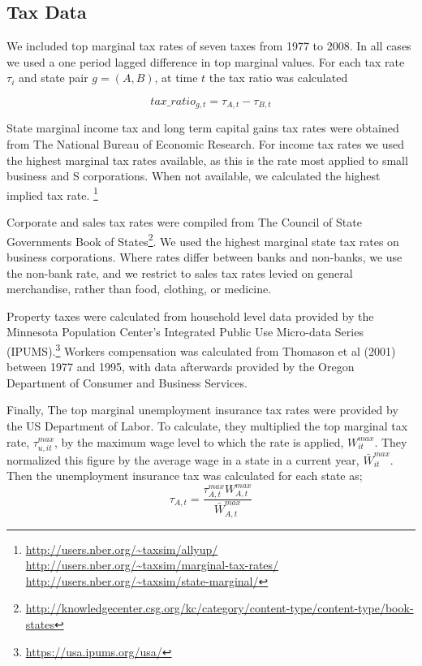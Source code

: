 \subsection{Tax Data}

We included top marginal tax rates of seven taxes from 1977 to 2008. In all cases we used a one period lagged difference in top marginal values. For each tax rate $\tau_{i}$ and state pair $g = (A,B)$, at time $t$ the tax ratio was calculated 

\begin{equation} tax\_ratio_{g,t} = \tau_{A,t}-\tau_{B,t} \end{equation}

State marginal income tax and long term capital gains tax rates were obtained from The National Bureau of Economic Research. For income tax rates we used the highest marginal tax rates available, as this is the rate most applied to small business and S corporations. When not available, we calculated the highest implied tax rate. \footnote{\url{http://users.nber.org/~taxsim/allyup/} \url{http://users.nber.org/~taxsim/marginal-tax-rates/} \url{http://users.nber.org/~taxsim/state-marginal/}}

Corporate and sales tax rates were compiled from The Council of State Governments Book of States\footnote{\url{http://knowledgecenter.csg.org/kc/category/content-type/content-type/book-states}}. We used the highest marginal state tax rates on business corporations. Where rates differ between banks and non-banks, we use the non-bank rate, and we restrict to sales tax rates levied on general merchandise, rather than food, clothing, or medicine. 

Property taxes were calculated from household level data provided by the Minnesota Population Center's Integrated Public Use Micro-data Series (IPUMS).\footnote{\url{https://usa.ipums.org/usa/}} Workers compensation was calculated from Thomason et al (2001) between 1977 and 1995, with data afterwards provided by the Oregon Department of Consumer and Business Services. 

Finally, The top marginal unemployment insurance tax rates were provided by the US Department of Labor. To calculate, they multiplied the top marginal tax rate, $\tau_{u,it}^{max}$, by the maximum wage level to which the rate is applied, $W_{it}^{max}$. They normalized this figure by the average wage in a state in a current year, $\bar W_{it}^{max}$. Then the unemployment insurance tax was calculated for each state as;
\begin{equation} \tau_{A,t} = \frac{\tau_{A,t}^{max}W_{A,t}^{max}}{\bar W_{A,t}^{max}}\end{equation}

